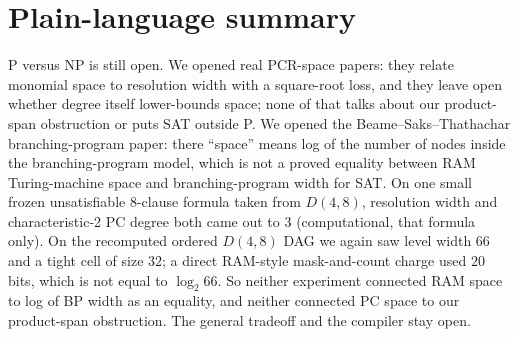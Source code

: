 \documentclass[11pt]{article}
\begin{document}
\section*{Plain-language summary}
P versus NP is still open.
We opened real PCR-space papers: they relate monomial space to resolution width with a square-root loss, and they leave open whether degree itself lower-bounds space; none of that talks about our product-span obstruction or puts SAT outside P.
We opened the Beame--Saks--Thathachar branching-program paper: there ``space'' means log of the number of nodes inside the branching-program model, which is not a proved equality between RAM Turing-machine space and branching-program width for SAT.
On one small frozen unsatisfiable \(8\)-clause formula taken from \(D(4,8)\), resolution width and characteristic-2 PC degree both came out to \(3\) (computational, that formula only).
On the recomputed ordered \(D(4,8)\) DAG we again saw level width \(66\) and a tight cell of size \(32\); a direct RAM-style mask-and-count charge used \(20\) bits, which is not equal to \(\log_2 66\).
So neither experiment connected RAM space to log of BP width as an equality, and neither connected PC space to our product-span obstruction.
The general tradeoff and the compiler stay open.

\end{document}
